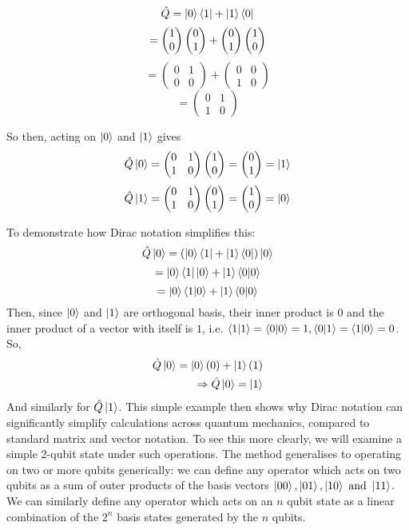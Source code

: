 \begin{example}
$$  \hat{Q} = \ket{0} \bra{1} + \ket{1} \langle0| $$
 $$ = \left(\begin{matrix}1\\0\end{matrix}\right) \left(\begin{matrix}0\\1\end{matrix}\right) + \left(\begin{matrix}0\\1\end{matrix}\right)\left(\begin{matrix}1\\0\end{matrix}\right) $$
 $$ = \begin{pmatrix}
 0 & 1 \\
 0 & 0 \end{pmatrix}  + 
 \begin{pmatrix}
 0&0 \\ 1 &0 
 \end{pmatrix} $$
 $$
 = 
 \begin{pmatrix}
 0&1 \\ 
 1&0
 \end{pmatrix} $$
 
 So then, acting on $\ket{0}$ and $\ket{1}$ gives
 $$ \hat{Q}\ket{0} = \begin{pmatrix} 0&1\\1&0 \end{pmatrix} \left(\begin{matrix}1\\0\end{matrix}\right) = \left(\begin{matrix}0\\1\end{matrix}\right) = \ket{1} $$
 $$ \hat{Q}\ket{1} = \begin{pmatrix} 0&1\\1&0 \end{pmatrix} \left(\begin{matrix}0\\1\end{matrix}\right) = \left(\begin{matrix}1\\0\end{matrix}\right) = \ket{0} $$
\end{example}
To demonstrate how Dirac notation simplifies this:
$$ \hat{Q}\ket{0} = (\ket{0} \bra{1} + \ket{1} \langle0|) \ket{0} $$
$$ = \ket{0} \bra{1} \ket{0} + \ket{1} \braket{0|0} $$
$$ = \ket{0} \braket{ 1 | 0} + \ket{1} \braket{0 | 0} $$
Then, since $\ket{0}$ and $\ket{1}$ are orthogonal basis, their inner product is $0$ and the inner product of a vector with itself is $1$, 
    i.e. $\braket{1|1} = \braket{0|0} = 1, \braket{0|1} = \braket{1|0} =0$. 
    So,
\begin{equation}
    \begin{split}
    \hat{Q}\ket{0} = \ket{0} (0) + \ket{1}(1) 
    \\ \Rightarrow \hat{Q}\ket{0} = \ket{1} 
    \end{split}
\end{equation}
And similarly for $\hat{Q}\ket{1}$. 
This simple example then shows why Dirac notation can significantly simplify calculations across quantum mechanics, 
    compared to standard matrix and vector notation. 
    To see this more clearly, we will examine a simple 2-qubit state under such operations. 
    The method generalises to operating on two or more qubits generically: 
    we can define any operator which acts on two qubits as a sum of outer products of the basis vectors $ \ket{00}, \ket{01}, \ket{10} \ \text{and} \ \ket{11}$. 
We can similarly define any operator which acts on an $n$ qubit state as a linear combination of the $2^n$ basis states generated by the $n$ qubits. 

